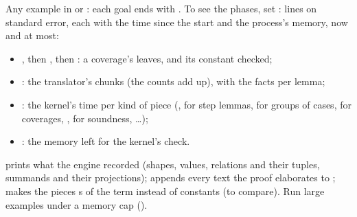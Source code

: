 Any example in  or : each goal
ends with . To see the phases, set :
lines on standard error, each with the time since the start and the
process's memory, now and at most:
\begin{itemize}
\item {}, then
  , then :
  a coverage's leaves, and its constant checked;
\item {}: the
  translator's chunks (the counts add up), with the facts per lemma;
\item {}: the kernel's time
  per kind of piece (,  for step lemmas,  for
  groups of cases,  for coverages, ,  for
  soundness, \dots);
\item {}: the memory left for the kernel's check.
\end{itemize}
 prints what the engine recorded (shapes, values,
relations and their tuples, summands and their projections);
 appends every text the proof elaborates to
;  makes the pieces s of the
term instead of constants (to compare). Run large examples under a
memory cap ().

